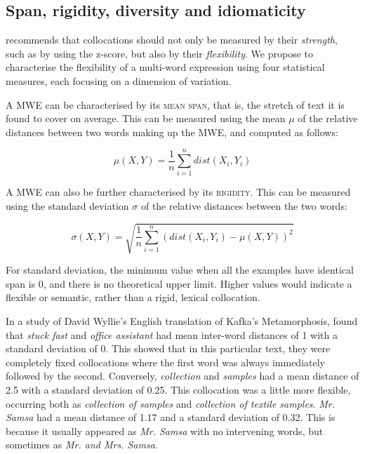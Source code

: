 \documentclass[output=paper]{langsci/langscibook}
\begin{document}
\subsection{Span, rigidity, diversity and idiomaticity}

\cite{smadja1993} recommends that collocations should not only be measured
by their \textit{strength}, such as by using the z-score,
but also by their \textit{flexibility}. We propose to
characterise the flexibility of a multi-word expression using four
statistical measures, each focusing on a dimension of variation.


A MWE can be characterised by its  \textsc{mean span}, that is,
the stretch of text it is found to cover on average. This can be
measured using the mean  $\mu$ of the relative distances between two
words making up the MWE, and computed as follows:


\begin{equation*}
\mu \left(X,Y\right)=\frac 1 n\sum _{i=1}^n\mathit{dist}(X_i,Y_i)
\end{equation*}





A MWE can also be further characterised by its
 \textsc{rigidity}. This can be measured using the standard
deviation  $\sigma$ of the relative distances between the two words: 


\begin{equation*}
\sigma\left(X,Y\right)=\sqrt{\frac 1 n\sum
_{i=1}^n\left(\mathit{dist}\left(X_i,Y_i\right)-\mu\left(X,Y\right)\right)^2}
\end{equation*}


For standard deviation, the minimum value when all the examples have
identical span is 0, and there is no theoretical upper limit. Higher
values would indicate a flexible or semantic, rather than a rigid,
lexical collocation.



In a study of David Wyllie’s English translation of Kafka’s
Metamorphosis, \cite{oakes2012} found that \textit{stuck fast} and \textit{office
assistant} had mean inter-word distances of 1 with a standard deviation
of 0. This showed that in this particular text, they were completely
fixed collocations where the first word was always immediately followed
by the second. Conversely, \textit{collection} and \textit{samples} had a mean
distance of 2.5 with a standard deviation of 0.25. This collocation was
a little more flexible, occurring both as \textit{collection of samples} and
\textit{collection of textile samples}. \textit{Mr. Samsa} had a mean distance of
1.17 and a standard deviation of 0.32. This is because it usually
appeared as \textit{Mr. Samsa} with no intervening words, but sometimes as
\textit{Mr. and Mrs. Samsa}. 
\end{document}
